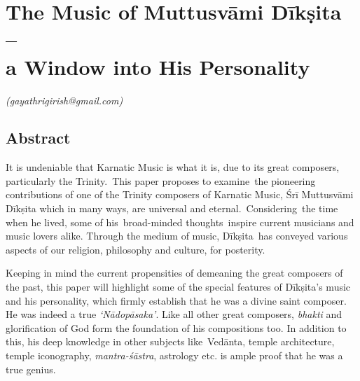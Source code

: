 \chapter{The Music of Muttusvāmi Dīkṣita –\\ a Window into His Personality}\label{chapter1}


\vspace{-.3cm}


\begin{flushright}
\textit{(gayathrigirish@gmail.com)}
\end{flushright}


\section*{Abstract}

It is undeniable that Karnatic Music is what it is, due to its great composers, particularly the Trinity.~This paper proposes to examine the pioneering contributions of one of the Trinity composers of Karnatic Music, Śrī Muttusvāmi Dīkṣita which in many ways, are universal and eternal.~Considering the time when he lived, some of his broad-minded thoughts inspire current musicians and music lovers alike. Through the medium of music, Dīkṣita has conveyed various aspects of our religion, philosophy and culture, for posterity.

Keeping in mind the current propensities of demeaning the great composers of the past, this paper will highlight some of the special features of Dīkṣita’s music and his personality, which firmly establish that he was a divine saint composer. He was indeed a true \textit{‘Nādopāsaka’}. Like all other great composers, \textit{bhakti} and glorification of God form the foundation of his compositions too. In addition to this, his deep knowledge in other subjects like Vedānta, temple architecture, temple iconography, \textit{mantra-śāstra}, astrology etc. is ample proof that he was a true genius. 

